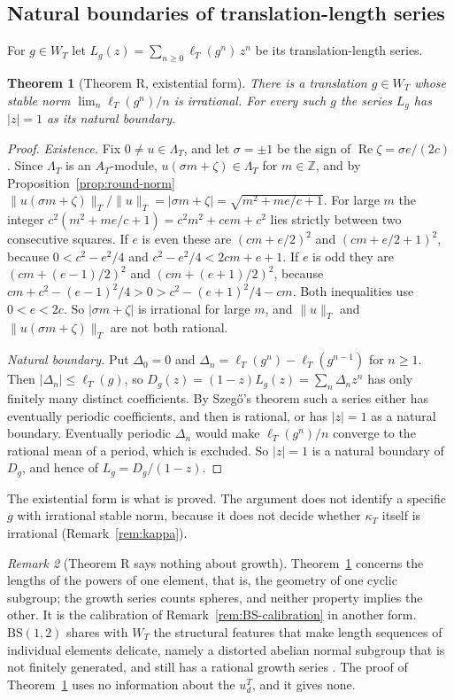 \documentclass[11pt]{article}
\theoremstyle{plain}
\newtheorem{theorem}{Theorem}
\theoremstyle{definition}
\theoremstyle{remark}
\newtheorem{remark}[theorem]{Remark}
\newcommand{\Z}{\mathbb{Z}}
\begin{document}
\subsection{Natural boundaries of translation-length series}

For $g\in W_T$ let $L_g(z)=\sum_{n\ge0}\ell_T(g^n)\,z^n$ be its
translation-length series.

\begin{theorem}[Theorem R, existential form]
\label{thm:WT-R}
There is a translation $g\in W_T$ whose stable norm
$\lim_n\ell_T(g^n)/n$ is irrational. For every such $g$ the series $L_g$ has
$|z|=1$ as its natural boundary.
\end{theorem}

\begin{proof}
\emph{Existence.} Fix $0\ne u\in\Lambda_T$, and let $\sigma=\pm1$ be the sign
of $\operatorname{Re}\zeta=\sigma e/(2c)$. Since $\Lambda_T$ is an $A_T$-module,
$u(\sigma m+\zeta)\in\Lambda_T$ for $m\in\Z$, and by
Proposition~\ref{prop:round-norm}
$\|u(\sigma m+\zeta)\|_T/\|u\|_T=|\sigma m+\zeta|=\sqrt{m^2+me/c+1}$. For large $m$ the integer
$c^2(m^2+me/c+1)=c^2m^2+cem+c^2$ lies strictly between two consecutive squares.
If $e$ is even these are $(cm+e/2)^2$ and $(cm+e/2+1)^2$, because $0<c^2-e^2/4$
and $c^2-e^2/4<2cm+e+1$. If $e$ is odd they are $(cm+(e-1)/2)^2$ and
$(cm+(e+1)/2)^2$, because $cm+c^2-(e-1)^2/4>0>c^2-(e+1)^2/4-cm$. Both inequalities
use $0<e<2c$. So $|\sigma m+\zeta|$ is irrational for large $m$, and $\|u\|_T$ and
$\|u(\sigma m+\zeta)\|_T$ are not both rational.

\emph{Natural boundary.} Put $\Delta_0=0$ and
$\Delta_n=\ell_T(g^n)-\ell_T(g^{n-1})$ for $n\ge1$. Then
$|\Delta_n|\le\ell_T(g)$, so $D_g(z)=(1-z)L_g(z)=\sum_n\Delta_nz^n$ has only
finitely many distinct coefficients. By Szeg\H{o}'s theorem \cite{Szego1922}
such a series either has eventually periodic coefficients, and then is
rational, or has $|z|=1$ as a natural boundary. Eventually periodic $\Delta_n$
would make $\ell_T(g^n)/n$ converge to the rational mean of a period, which is
excluded. So $|z|=1$ is a natural boundary of $D_g$, and hence of
$L_g=D_g/(1-z)$.
\end{proof}

The existential form is what is proved. The argument does not identify a
specific $g$ with irrational stable norm, because it does not decide whether
$\kappa_T$ itself is irrational (Remark~\ref{rem:kappa}).

\begin{remark}[Theorem R says nothing about growth]
\label{rem:R-not-growth}
Theorem~\ref{thm:WT-R} concerns the lengths of the powers of one element, that
is, the geometry of one cyclic subgroup; the growth series counts spheres, and
neither property implies the other. It is the calibration of
Remark~\ref{rem:BS-calibration} in another form. $\mathrm{BS}(1,2)$ shares with $W_T$
the structural features that make length sequences of individual elements
delicate, namely a distorted abelian normal subgroup that is not finitely
generated, and still has a rational growth series \cite{CEG1994}. The proof of
Theorem~\ref{thm:WT-R} uses no information about the $u_d^T$, and it gives none.
\end{remark}
\end{document}
